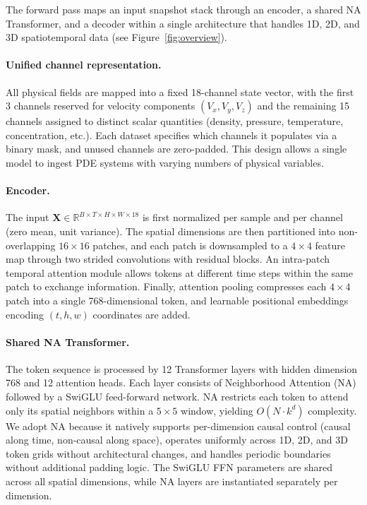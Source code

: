 \documentclass{article}
\begin{document}
The forward pass maps an input snapshot stack through an encoder, a shared NA Transformer, and a decoder within a single architecture that handles 1D, 2D, and 3D spatiotemporal data (see Figure~\ref{fig:overview}).

\paragraph{Unified channel representation.}
All physical fields are mapped into a fixed 18-channel state vector, with the first 3 channels reserved for velocity components $(V_x, V_y, V_z)$ and the remaining 15 channels assigned to distinct scalar quantities (density, pressure, temperature, concentration, etc.). Each dataset specifies which channels it populates via a binary mask, and unused channels are zero-padded. This design allows a single model to ingest PDE systems with varying numbers of physical variables.

\paragraph{Encoder.}
The input $\mathbf{X} \in \mathbb{R}^{B \times T \times H \times W \times 18}$ is first normalized per sample and per channel (zero mean, unit variance). The spatial dimensions are then partitioned into non-overlapping $16 \times 16$ patches, and each patch is downsampled to a $4 \times 4$ feature map through two strided convolutions with residual blocks. An intra-patch temporal attention module allows tokens at different time steps within the same patch to exchange information. Finally, attention pooling compresses each $4 \times 4$ patch into a single 768-dimensional token, and learnable positional embeddings encoding $(t, h, w)$ coordinates are added.

\paragraph{Shared NA Transformer.}
The token sequence is processed by 12 Transformer layers with hidden dimension 768 and 12 attention heads. Each layer consists of Neighborhood Attention (NA)~\cite{hassani2023neighborhood} followed by a SwiGLU feed-forward network. NA restricts each token to attend only its spatial neighbors within a $5 \times 5$ window, yielding $O(N \cdot k^d)$ complexity. We adopt NA because it natively supports per-dimension causal control (causal along time, non-causal along space), operates uniformly across 1D, 2D, and 3D token grids without architectural changes, and handles periodic boundaries without additional padding logic. The SwiGLU FFN parameters are shared across all spatial dimensions, while NA layers are instantiated separately per dimension.
\end{document}
